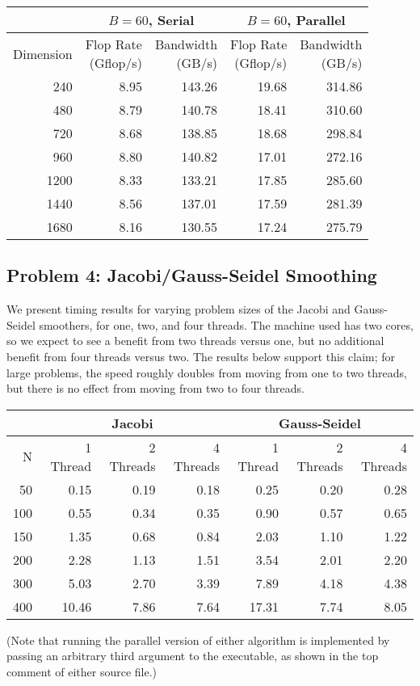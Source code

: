 \documentclass[11pt]{article}
\theoremstyle{plain} %
\begin{document}
\begin{center}
\small
\begin{tabular}{r|rr|rr}
  & \multicolumn{2}{c|}{$B = 60$, Serial} & \multicolumn{2}{c}{$B = 60$, Parallel} \\
  \hline
  Dimension & \makecell{Flop Rate \\ (Gflop/s)} & \makecell{Bandwidth \\ (GB/s)} & \makecell{Flop Rate \\ (Gflop/s)} & \makecell{Bandwidth \\ (GB/s)} \\
  \hline
  240 & 8.95 & 143.26 & 19.68 & 314.86 \\
  480 & 8.79 & 140.78 & 18.41 & 310.60 \\
  720 & 8.68 & 138.85 & 18.68 & 298.84 \\
  960 & 8.80 & 140.82 & 17.01 & 272.16 \\
  1200 & 8.33 & 133.21 & 17.85 & 285.60 \\
  1440 & 8.56 & 137.01 & 17.59 & 281.39 \\
  1680 & 8.16 & 130.55 & 17.24 & 275.79 \\
  \hline
\end{tabular}
\end{center}

\subsection*{Problem 4: Jacobi/Gauss-Seidel Smoothing}

We present timing results for varying problem sizes of the Jacobi and Gauss-Seidel smoothers, for one, two, and four threads.
The machine used has two cores, so we expect to see a benefit from two threads versus one, but no additional benefit from four threads versus two.
The results below support this claim; for large problems, the speed roughly doubles from moving from one to two threads, but there is no effect from moving from two to four threads.

\begin{center}
\small
\begin{tabular}{r|rrr|rrr}
  & \multicolumn{3}{c|}{Jacobi} & \multicolumn{3}{c}{Gauss-Seidel} \\
  \hline
  N & 1 Thread & 2 Threads & 4 Threads & 1 Thread & 2 Threads & 4 Threads \\
  \hline
  50 & 0.15 & 0.19 & 0.18 & 0.25 & 0.20 & 0.28 \\
  100 & 0.55 & 0.34 & 0.35 & 0.90 & 0.57 & 0.65 \\
  150 & 1.35 & 0.68 & 0.84 & 2.03 & 1.10 & 1.22 \\
  200 & 2.28 & 1.13 & 1.51 & 3.54 & 2.01 & 2.20 \\
  300 & 5.03 & 2.70 & 3.39 & 7.89 & 4.18 & 4.38 \\
  400 & 10.46 & 7.86 & 7.64 & 17.31 & 7.74 & 8.05 \\
  \hline
\end{tabular}
\end{center}

\noindent
(Note that running the parallel version of either algorithm is implemented by passing an arbitrary third argument to the executable, as shown in the top comment of either source file.)
\end{document}
